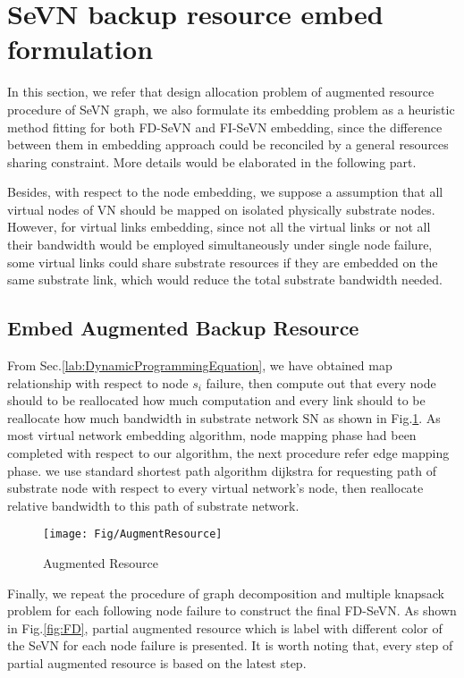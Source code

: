 \section{SeVN backup resource embed formulation}
In this section, we refer that design allocation problem of augmented resource procedure of SeVN graph, we also formulate its embedding problem as a heuristic method fitting for both FD-SeVN and FI-SeVN embedding, since the difference between them in embedding approach could be reconciled by a general resources sharing constraint. More details would be elaborated in the following part.

Besides, with respect to the node embedding, we suppose a assumption that all virtual nodes of VN should be mapped on isolated physically substrate nodes. However, for virtual links embedding, since not all the virtual links or not all their bandwidth would be employed simultaneously under single node failure, some virtual links could share substrate resources if they are embedded on the same substrate link, which would reduce the total substrate bandwidth needed.


\subsection{Embed  Augmented Backup Resource}
From Sec.\ref{lab:DynamicProgrammingEquation}, we have obtained map relationship with respect to node $s_i$ failure, then compute out that every node should to be reallocated how much computation and every link should to be reallocate how much bandwidth in substrate network SN as shown in Fig.\ref{fig:AugmentResource}. As most virtual network embedding algorithm, node mapping phase had been completed with respect to our algorithm, the next procedure refer edge mapping phase. we use standard shortest path algorithm dijkstra for requesting path of substrate node with respect to every virtual network's node, then reallocate relative bandwidth to this path of substrate network.

\begin{figure}
  \centering
  \texttt{[image: Fig/AugmentResource]}\\
  \caption{Augmented Resource}\label{fig:AugmentResource}
\end{figure}

Finally, we repeat the procedure of graph decomposition and multiple knapsack problem for each following node failure to construct the final FD-SeVN. As shown in Fig.\ref{fig:FD}, partial augmented resource which is label with different color of the SeVN for each node failure is presented. It is worth noting that, every step of partial augmented resource is based on the latest step.


